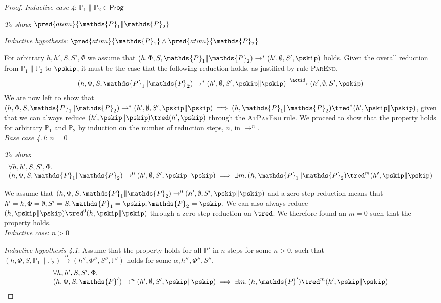 {\begin{proof}
\textit{Inductive case 4}: $\mathds{P}_1 \| \mathds{P}_2 \in \mathsf{Prog}$

\textit{To show}: $\pred{atom}{\mathds{P}_1 \| \mathds{P}_2}$

\textit{Inductive hypothesis}: $\pred{atom}{\mathds{P}_1} \land \pred{atom}{\mathds{P}_2}$

For arbitrary $h, h', S, S', \Phi$ we assume that $(h, \Phi, S, \mathds{P}_1 \| \mathds{P}_2) \rightarrow^* (h', \emptyset, S', \pskip)$ holds. Given the overall reduction from $\mathds{P}_1 \| \mathds{P}_2$ to $\pskip$, it must be the case that the following reduction holds, as justified by rule \textsc{ParEnd}.
\[
(h, \Phi, S, \mathds{P}_1 \| \mathds{P}_2) \rightarrow^* (h', \emptyset, S', \pskip \| \pskip) \xrightarrow{\actid} (h', \emptyset, S', \pskip)
\]
We are now left to show that $(h, \Phi, S, \mathds{P}_1 \| \mathds{P}_2) \rightarrow^* (h', \emptyset, S', \pskip \| \pskip) \implies (h, \mathds{P}_1 \| \mathds{P}_2) \tred^* (h', \pskip \| \pskip)$, given that we can always reduce $(h', \pskip \| \pskip) \tred (h', \pskip)$ through the \textsc{AtParEnd} rule. We proceed to show that the property holds for arbitrary $\mathds{P}_1$ and $\mathds{P}_2$ by induction on the number of reduction steps, $n$, in $\rightarrow^n$. \\

\textit{Base case 4.1}: $n = 0$

\textit{To show}:
\[
\begin{array}{l}
\forall h, h', S, S', \Phi \ldotp \\
(h, \Phi, S, \mathds{P}_1 \| \mathds{P}_2) \rightarrow^0 (h', \emptyset, S', \pskip \| \pskip) \implies \exists m \ldotp (h, \mathds{P}_1 \| \mathds{P}_2) \tred^m (h', \pskip \| \pskip)
\end{array}
\]

We assume that $(h, \Phi, S, \mathds{P}_1 \| \mathds{P}_2) \rightarrow^0 (h', \emptyset, S', \pskip \| \pskip)$ and a zero-step reduction means that $h' = h, \Phi = \emptyset, S' = S, \mathds{P}_1 = \pskip, \mathds{P}_2 = \pskip$. We can also always reduce $(h, \pskip \| \pskip) \tred^0 (h, \pskip \| \pskip)$ through a zero-step reduction on $\tred$. We therefore found an $m = 0$ such that the property holds. \\

\textit{Inductive case}: $n > 0$

\textit{Inductive hypothesis 4.1}: Assume that the property holds for all $\mathds{P}'$ in $n$ steps for some $n > 0$, such that $(h, \Phi, S, \mathds{P}_1 \| \mathds{P}_2) \xrightarrow{\alpha} (h'', \Phi'', S'', \mathds{P}')$ holds for some $\alpha, h'', \Phi'', S''$.
\[
\begin{array}{l}
\forall h, h', S, S', \Phi \ldotp \\
(h, \Phi, S, \mathds{P}') \rightarrow^n (h', \emptyset, S', \pskip \| \pskip) \implies \exists m \ldotp (h, \mathds{P}') \tred^m (h', \pskip \| \pskip)
\end{array}
\]


\end{proof}}

